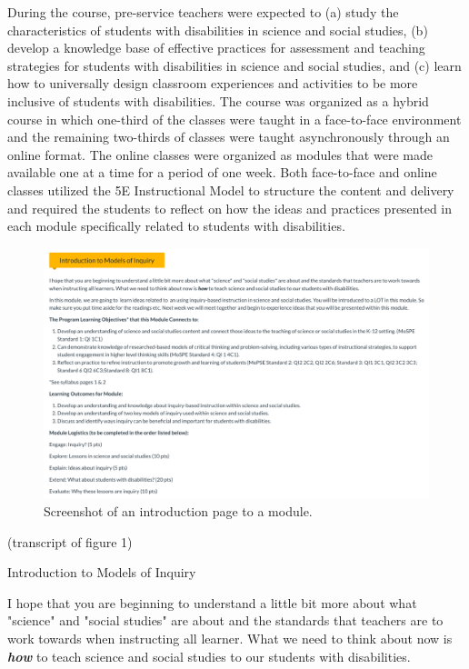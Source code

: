 \documentclass[11.5pt]{sig-alternate} %
\begin{document}
\begin{large}
During the course, pre-service teachers were expected to (a) study the characteristics of students with disabilities in science and social studies, (b) develop a knowledge base of effective practices for assessment and teaching strategies for students with disabilities in science and social studies, and (c) learn how to universally design classroom experiences and activities to be more inclusive of students with disabilities. The course was organized as a hybrid course in which one-third of the classes were taught in a face-to-face environment and the remaining two-thirds of classes were taught asynchronously through an online format. The online classes were organized as modules that were made available one at a time for a period of one week. Both face-to-face and online classes utilized the 5E Instructional Model to structure the content and delivery and required the students to reflect on how the ideas and practices presented in each module specifically related to students with disabilities.

\begin{figure}[!t]
    \includegraphics[width=\textwidth]{Fig-1.png}
    \caption{Screenshot of an introduction page to a module.}
\end{figure}

(transcript of figure 1)

Introduction to Models of Inquiry

I hope that you are beginning to understand a little bit more about what "science" and "social studies" are about and the standards that teachers are to work towards when instructing all learner. What we need to think about now is \textbf{\textit{how}} to teach science and social studies to our students with disabilities.


\end{large}
\end{document}
